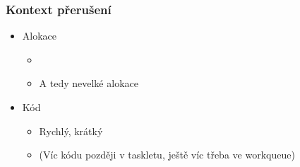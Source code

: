 \begin{frame}
  \frametitle{Kontext přerušení}

  \begin{itemize}
    \item Alokace
    \begin{itemize}
      \item {}
      \item A tedy nevelké alokace
    \end{itemize}

    \item Kód
    \begin{itemize}
      \item Rychlý, krátký
      \item (Víc kódu později v taskletu, ještě víc třeba ve workqueue)
    \end{itemize}
  \end{itemize}

\end{frame}

